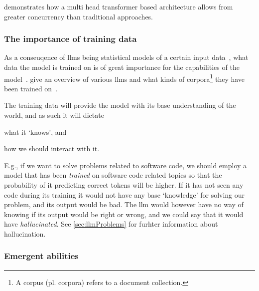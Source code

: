 
 demonstrates how a multi head transformer based architecture
allows from greater concurrency than traditional approaches.

%

\subsubsection{The importance of training data}

As a conseuqence of \acrshort{llms} being statistical models of a certain input
data~\cite[1]{llmSurvey}, what data the model is trained on is of great
importance for the capabilities of the model~\cite[6]{llmSurvey}.
\citeauthor{llmSurvey} give an overview of various \acrshort{llms} and what
kinds of corpora\footnote{A corpus (pl. corpora) refers to a document
    collection.} they have been trained on~\cite[11-14]{llmSurvey}.

The training data will provide the model with its base understanding of the
world, and as such it will dictate \begin{inparaenum}
    \item what it `knows', and
    \item how we should interact with it.
\end{inparaenum}
E.g., if we want to solve problems related to software code, we should employ a
model that has been \textit{trained} on software code related topics so that the
probability of it predicting correct tokens will be higher. If it has not seen
any code during its training it would not have any base `knowledge' for solving
our problem, and its output would be bad. The \acrshort{llm} would however have
no way of knowing if its output would be right or wrong, and we could say that
it would have \textit{hallucinated}.
See \cref{sec:llmProblems} for furhter information
about hallucination.


\subsubsection{Emergent abilities}\label{sec:emergentAbilities}

